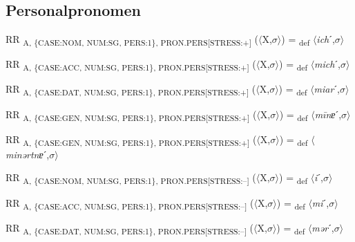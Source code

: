 {\subsection{Personalpronomen}

\begin{exe}
 RR \textsubscript{A, \{CASE:NOM, NUM:SG, PERS:1\}, PRON.PERS[STRESS:+]} ($\langle$X,$\sigma $$\rangle$) = \textsubscript{def} $\langle$\textit{ich}ˊ,$\sigma $$\rangle$
\end{exe}

\begin{exe}
 RR \textsubscript{A, \{CASE:ACC, NUM:SG, PERS:1\}, PRON.PERS[STRESS:+]} ($\langle$X,$\sigma $$\rangle$) = \textsubscript{def} $\langle$\textit{mich}ˊ,$\sigma $$\rangle$
\end{exe}

\begin{exe}
 RR \textsubscript{A, \{CASE:DAT, NUM:SG, PERS:1\}, PRON.PERS[STRESS:+]} ($\langle$X,$\sigma $$\rangle$) = \textsubscript{def} $\langle$\textit{miar}ˊ,$\sigma $$\rangle$
\end{exe}

\begin{exe}
 RR \textsubscript{A, \{CASE:GEN, NUM:SG, PERS:1\}, PRON.PERS[STRESS:+]} ($\langle$X,$\sigma $$\rangle$) = \textsubscript{def} $\langle$\textit{m\=inɐ}ˊ,$\sigma $$\rangle$
\end{exe}

\begin{exe}
 RR \textsubscript{A, \{CASE:GEN, NUM:SG, PERS:1\}, PRON.PERS[STRESS:+]} ($\langle$X,$\sigma $$\rangle$) = \textsubscript{def} $\langle$\textit{minərtnɐ}ˊ,$\sigma $$\rangle$
\end{exe}

\begin{exe}
 RR \textsubscript{A, \{CASE:NOM, NUM:SG, PERS:1\}, PRON.PERS[STRESS:–]} ($\langle$X,$\sigma $$\rangle$) = \textsubscript{def} $\langle$\textit{i}ˊ,$\sigma $$\rangle$
\end{exe}

\begin{exe}
 RR \textsubscript{A, \{CASE:ACC, NUM:SG, PERS:1\}, PRON.PERS[STRESS:–]} ($\langle$X,$\sigma $$\rangle$) = \textsubscript{def} $\langle$\textit{mi}ˊ,$\sigma $$\rangle$
\end{exe}

\begin{exe}
 RR \textsubscript{A, \{CASE:DAT, NUM:SG, PERS:1\}, PRON.PERS[STRESS:–]} ($\langle$X,$\sigma $$\rangle$) = \textsubscript{def} $\langle$\textit{mər}ˊ,$\sigma $$\rangle$
\end{exe}

}

